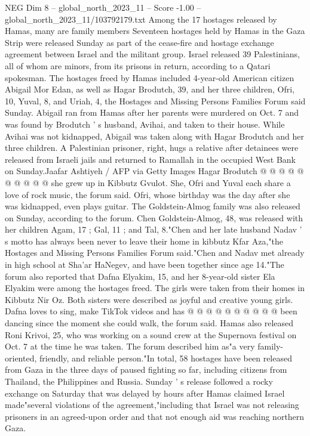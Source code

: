 \begin{textsample}{NEG Dim 8 – global\_north\_2023\_11 – Score -1.00 – global\_north\_2023\_11/103792179.txt}  \label{ex:f8_neg_264}
Among the 17 hostages released by Hamas, many are family members Seventeen hostages held by Hamas in the Gaza Strip were released Sunday as part of the cease-fire and hostage exchange agreement between Israel and the militant group.
Israel released 39 Palestinians, all of whom are minors, from its prisons in return, according to a Qatari spokesman.
The hostages freed by Hamas included 4-year-old American citizen Abigail Mor Edan, as well as Hagar Brodutch, 39, and her three children, Ofri, 10, Yuval, 8, and Uriah, 4, the Hostages and Missing Persons Families Forum said Sunday.
Abigail ran from Hamas after her parents were murdered on Oct. 7 and was found by Brodutch ' s husband, Avihai, and taken to their house.
While Avihai was not kidnapped, Abigail was taken along with Hagar Brodutch and her three children.
A Palestinian prisoner, right, hugs a relative after detainees were released from Israeli jails and returned to Ramallah in the occupied West Bank on Sunday.Jaafar Ashtiyeh / AFP via Getty Images Hagar Brodutch @ @ @ @ @ @ @ @ @ @ she grew up in Kibbutz Gvulot.
She, Ofri and Yuval each share a love of rock music, the forum said.
Ofri, whose birthday was the day after she was kidnapped, even plays guitar.
The Goldstein-Almog family was also released on Sunday, according to the forum.
Chen Goldstein-Almog, 48, was released with her children Agam, 17 ; Gal, 11 ; and Tal, 8."Chen and her late husband Nadav ' s motto has always been never to leave their home in kibbutz Kfar Aza,"the Hostages and Missing Persons Families Forum said."Chen and Nadav met already in high school at Sha'ar HaNegev, and have been together since age 14."The forum also reported that Dafna Elyakim, 15, and her 8-year-old sister Ela Elyakim were among the hostages freed.
The girls were taken from their homes in Kibbutz Nir Oz.
Both sisters were described as joyful and creative young girls.
Dafna loves to sing, make TikTok videos and has @ @ @ @ @ @ @ @ @ @ been dancing since the moment she could walk, the forum said.
Hamas also released Roni Krivoi, 25, who was working on a sound crew at the Supernova festival on Oct. 7 at the time he was taken.
The forum described him as"a very family-oriented, friendly, and reliable person."In total, 58 hostages have been released from Gaza in the three days of paused fighting so far, including citizens from Thailand, the Philippines and Russia.
Sunday ' s release followed a rocky exchange on Saturday that was delayed by hours after Hamas claimed Israel made"several violations of the agreement,"including that Israel was not releasing prisoners in an agreed-upon order and that not enough aid was reaching northern Gaza.

\end{textsample}
